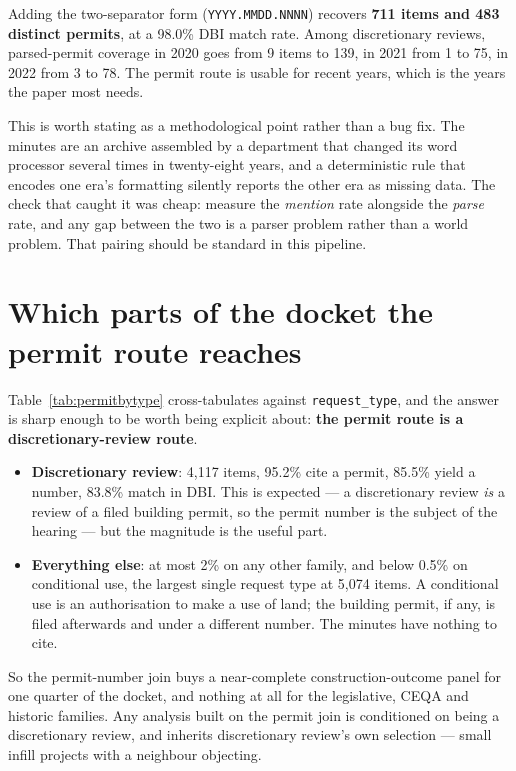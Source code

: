 \documentclass[11pt]{article}
\begin{document}
Adding the two-separator form (\texttt{YYYY.MMDD.NNNN}) recovers \textbf{711 items and 483
distinct permits}, at a 98.0\% DBI match rate. Among discretionary reviews, parsed-permit
coverage in 2020 goes from 9 items to 139, in 2021 from 1 to 75, in 2022 from 3 to 78. The
permit route is usable for recent years, which is the years the paper most needs.

This is worth stating as a methodological point rather than a bug fix. The minutes are an
archive assembled by a department that changed its word processor several times in
twenty-eight years, and a deterministic rule that encodes one era's formatting silently
reports the other era as missing data. The check that caught it was cheap: measure the
\emph{mention} rate alongside the \emph{parse} rate, and any gap between the two is a parser
problem rather than a world problem. That pairing should be standard in this pipeline.

\section{Which parts of the docket the permit route reaches}

Table~\ref{tab:permitbytype} cross-tabulates against \texttt{request\_type}, and the answer is
sharp enough to be worth being explicit about: \textbf{the permit route is a discretionary-review
route}.

\begin{itemize}
\item \textbf{Discretionary review}: 4{,}117 items, 95.2\% cite a permit, 85.5\% yield a
number, 83.8\% match in DBI. This is expected --- a discretionary review \emph{is} a review of
a filed building permit, so the permit number is the subject of the hearing --- but the
magnitude is the useful part.
\item \textbf{Everything else}: at most 2\% on any other family, and below 0.5\% on
conditional use, the largest single request type at 5{,}074 items. A conditional use is an
authorisation to make a use of land; the building permit, if any, is filed afterwards and
under a different number. The minutes have nothing to cite.
\end{itemize}

So the permit-number join buys a near-complete construction-outcome panel for one quarter of
the docket, and nothing at all for the legislative, CEQA and historic families. Any analysis
built on the permit join is conditioned on being a discretionary review, and inherits
discretionary review's own selection --- small infill projects with a neighbour objecting.
\end{document}
